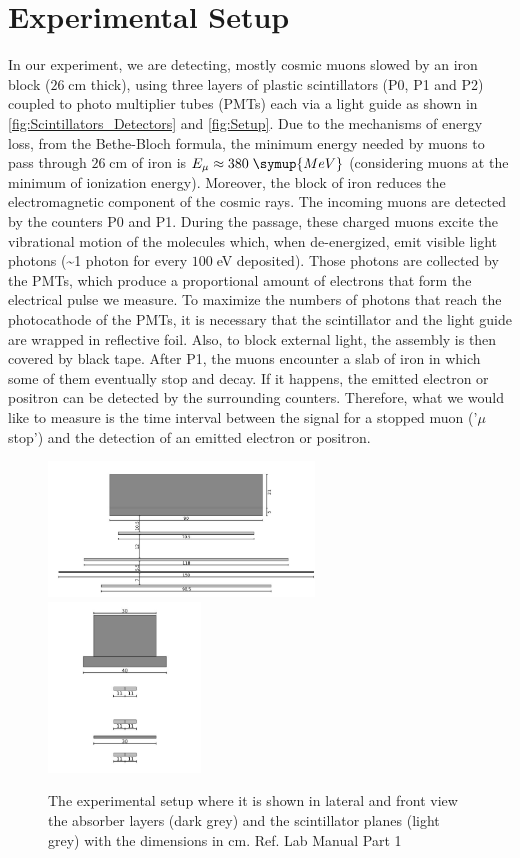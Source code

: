 \chapter{Experimental Setup}
\label{sec:setup}
	In our experiment, we are detecting, mostly cosmic muons slowed by an iron block ($26\;$cm thick),
	using three layers of plastic scintillators (P0, P1 and P2) coupled to photo multiplier tubes (PMTs) 
	each via a light guide as shown in \autoref{fig:Scintillators_Detectors} and \autoref{fig:Setup}.
	Due to the mechanisms of energy loss, from the Bethe-Bloch formula, the minimum energy needed by muons to pass through 
	$26\;$cm of iron is $E_{\mu} \approx 380 \; \symup{MeV}$ (considering muons at the minimum of ionization energy).
	 Moreover, the block of iron reduces the electromagnetic component of the cosmic rays.
	The incoming muons are detected by the counters P0 and P1.
	During the passage, these charged muons excite the vibrational motion of the molecules which, when de-energized, 
	emit visible light photons (\textasciitilde 1 photon for every $100\;$eV deposited). Those photons are collected by the PMTs, which
	produce a proportional amount of electrons that form the electrical pulse we measure.
	To maximize the numbers of photons that reach the photocathode of the PMTs, it is 
	necessary that the scintillator and the light guide are wrapped in reflective foil. Also, 
	to block
	external light, the assembly is then covered by black tape.
	After P1, the muons encounter a slab of iron in which some of them eventually stop and decay. If it happens,
	the emitted electron or positron can be detected by the surrounding counters. Therefore,
	what we would like to measure is the time interval between the signal for a stopped muon (’$\mu$ stop’) and the
	detection of an emitted electron or positron.
	\begin{figure}
		\centering
		\includegraphics[width=0.63\textwidth]{figures/11.png}
		\includegraphics[width=0.36\textwidth]{figures/22.png}
		\caption{The experimental setup where it is shown in lateral and front view the absorber layers (dark grey) and the scintillator planes (light grey) with the dimensions in cm. Ref. Lab Manual Part 1}
		\label{fig:Scintillators_Detectors}
	\end{figure}
